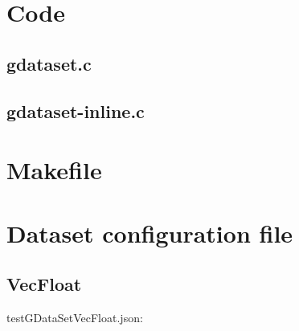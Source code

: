 \section{Code}

\subsection{gdataset.c}

\begin{scriptsize}
\begin{ttfamily}

\end{ttfamily}
\end{scriptsize}

\subsection{gdataset-inline.c}

\begin{scriptsize}
\begin{ttfamily}

\end{ttfamily}
\end{scriptsize}

\section{Makefile}

\begin{scriptsize}
\begin{ttfamily}

\end{ttfamily}
\end{scriptsize}

\section{Dataset configuration file}

\subsection{VecFloat}

testGDataSetVecFloat.json:
\begin{scriptsize}
\begin{ttfamily}

\end{ttfamily}
\end{scriptsize}

